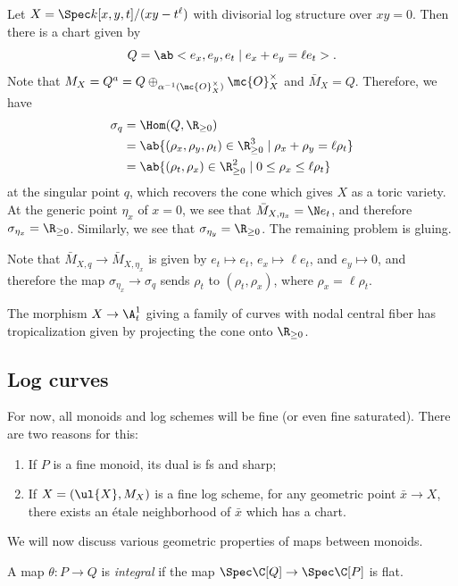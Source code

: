 \begin{exm}
    Let \(X = \Spec k[x,y,t]/(xy-t^{\ell})\) with divisorial log structure over \(xy = 0\). Then there is a chart given by
    \[ Q = \ab<e_x, e_y, e_t \mid e_x + e_y = \ell e_t>. \]
    Note that \(M_X = Q^a = Q \oplus_{\alpha^{-1}(\mc{O}_X^{\times})} \mc{O}_X^{\times}\) and \(\bar{M}_X = Q\). Therefore, we have
    \begin{align*}
        \sigma_q &= \Hom(Q, \R_{\geq 0}) \\
        &= \ab\{ (\rho_x, \rho_y, \rho_t) \in \R_{\geq 0}^3 \mid \rho_x + \rho_y = \ell \rho_t \} \\
        &= \ab\{ (\rho_t, \rho_x) \in \R_{\geq 0}^2 \mid 0 \leq \rho_x \leq \ell \rho_t \}
    \end{align*}
    at the singular point \(q\), which recovers the cone which gives \(X\) as a toric variety. At the generic point \(\eta_x\) of \(x = 0\), we see that \(\bar{M}_{X, \eta_x} = \N e_t\), and therefore \(\sigma_{\eta_x} = \R_{\geq 0}\). Similarly, we see that \(\sigma_{\eta_y} = \R_{\geq 0}\). The remaining problem is gluing. 

    Note that \(\bar{M}_{X, q} \to \bar{M}_{X, \eta_x}\) is given by \(e_t \mapsto e_t\), \(e_x \mapsto \ell e_t\), and \(e_y \mapsto 0\), and therefore the map \(\sigma_{\eta_x} \to \sigma_q\) sends \(\rho_t\) to \((\rho_t, \rho_x)\), where \(\rho_x = \ell \rho_t\).

    The morphism \(X \to \A^1_t\) giving a family of curves with nodal central fiber has tropicalization given by projecting the cone onto \(\R_{\geq 0}\).
\end{exm}


\subsection{Log curves}%
\label{sub:Log curves}

For now, all monoids and log schemes will be fine (or even fine saturated). There are two reasons for this:
\begin{enumerate}
    \item If \(P\) is a fine monoid, its dual is fs and sharp;
    \item If \(X = (\ul{X}, M_X)\) is a fine log scheme, for any geometric point \(\bar{x} \to X\), there exists an \'etale neighborhood of \(\bar{x}\) which has a chart.
\end{enumerate}

We will now discuss various geometric properties of maps between monoids.
\begin{defn}
    A map \(\theta \colon P \to Q\) is \textit{integral} if the map \(\Spec\C[Q] \to \Spec \C[P]\) is flat.
\end{defn}

